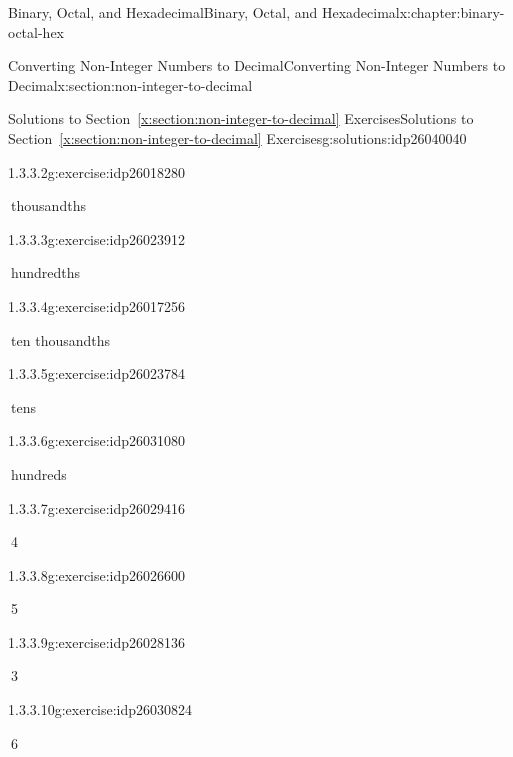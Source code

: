 \documentclass[twoside,10pt,]{book}
\newcommand{\xreffont}{\relax}
\numberwithin{equation}{section}
\begin{document}
\begin{chapterptx}{Binary, Octal, and Hexadecimal}{}{Binary, Octal, and Hexadecimal}{}{}{x:chapter:binary-octal-hex}
\begin{sectionptx}{Converting Non-Integer Numbers to Decimal}{}{Converting Non-Integer Numbers to Decimal}{}{}{x:section:non-integer-to-decimal}
\begin{solutions-subsection}{Solutions to Section~{\xreffont\ref*{x:section:non-integer-to-decimal}} Exercises}{}{Solutions to Section~{\xreffont\ref*{x:section:non-integer-to-decimal}} Exercises}{}{}{g:solutions:idp26040040}
\begin{exercisegroup}
\begin{divisionsolutioneg}{1.3.3.2}{}{g:exercise:idp26018280}
\par\smallskip%
\noindent\hypertarget{g:solution:idp26022120-main}{}\(\ \)thousandths\end{divisionsolutioneg}%
\begin{divisionsolutioneg}{1.3.3.3}{}{g:exercise:idp26023912}%
\par\smallskip%
\noindent\hypertarget{g:solution:idp26017896-main}{}\(\ \)hundredths\end{divisionsolutioneg}%
\begin{divisionsolutioneg}{1.3.3.4}{}{g:exercise:idp26017256}%
\par\smallskip%
\noindent\hypertarget{g:solution:idp26021352-main}{}\(\ \)ten thousandths\end{divisionsolutioneg}%
\begin{divisionsolutioneg}{1.3.3.5}{}{g:exercise:idp26023784}%
\par\smallskip%
\noindent\hypertarget{g:solution:idp26024936-main}{}\(\ \)tens\end{divisionsolutioneg}%
\begin{divisionsolutioneg}{1.3.3.6}{}{g:exercise:idp26031080}%
\par\smallskip%
\noindent\hypertarget{g:solution:idp26030696-main}{}\(\ \)hundreds\end{divisionsolutioneg}%
\end{exercisegroup}
\par\medskip\noindent
\begin{exercisegroup}
\begin{divisionsolutioneg}{1.3.3.7}{}{g:exercise:idp26029416}%
\par\smallskip%
\noindent\hypertarget{g:solution:idp26028904-main}{}\(\ \)4\end{divisionsolutioneg}%
\begin{divisionsolutioneg}{1.3.3.8}{}{g:exercise:idp26026600}%
\par\smallskip%
\noindent\hypertarget{g:solution:idp26031208-main}{}\(\ \)5\end{divisionsolutioneg}%
\begin{divisionsolutioneg}{1.3.3.9}{}{g:exercise:idp26028136}%
\par\smallskip%
\noindent\hypertarget{g:solution:idp26029032-main}{}\(\ \)3\end{divisionsolutioneg}%
\begin{divisionsolutioneg}{1.3.3.10}{}{g:exercise:idp26030824}%
\par\smallskip%
\noindent\hypertarget{g:solution:idp26029160-main}{}\(\ \)6\end{divisionsolutioneg}%

\end{exercisegroup}
\end{solutions-subsection}
\end{sectionptx}
\end{chapterptx}
\end{document}
